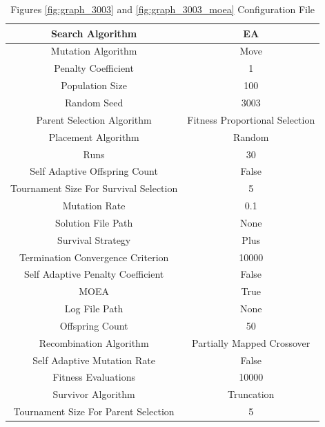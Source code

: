 \documentclass{standalone}
\begin{document}
\begin{table}[!htb]
	\centering
	\caption{Figures \ref{fig:graph_3003} and \ref{fig:graph_3003_moea} Configuration File}
	\label{tab:graph_3003}
	\begin{tabular}{| c | c |}
		\hline
		Search Algorithm		& EA		 \\
		\hline
		Mutation Algorithm		& Move		 \\
		\hline
		Penalty Coefficient		& 1		 \\
		\hline
		Population Size		& 100		 \\
		\hline
		Random Seed		& 3003		 \\
		\hline
		Parent Selection Algorithm		& Fitness Proportional Selection		 \\
		\hline
		Placement Algorithm		& Random		 \\
		\hline
		Runs		& 30		 \\
		\hline
		Self Adaptive Offspring Count		& False		 \\
		\hline
		Tournament Size For Survival Selection		& 5		 \\
		\hline
		Mutation Rate		& 0.1		 \\
		\hline
		Solution File Path		& None		 \\
		\hline
		Survival Strategy		& Plus		 \\
		\hline
		Termination Convergence Criterion		& 10000		 \\
		\hline
		Self Adaptive Penalty Coefficient		& False		 \\
		\hline
		MOEA		& True		 \\
		\hline
		Log File Path		& None		 \\
		\hline
		Offspring Count		& 50		 \\
		\hline
		Recombination Algorithm		& Partially Mapped Crossover		 \\
		\hline
		Self Adaptive Mutation Rate		& False		 \\
		\hline
		Fitness Evaluations		& 10000		 \\
		\hline
		Survivor Algorithm		& Truncation		 \\
		\hline
		Tournament Size For Parent Selection		& 5		 \\
		\hline
	\end{tabular}
\end{table}
\end{document}
